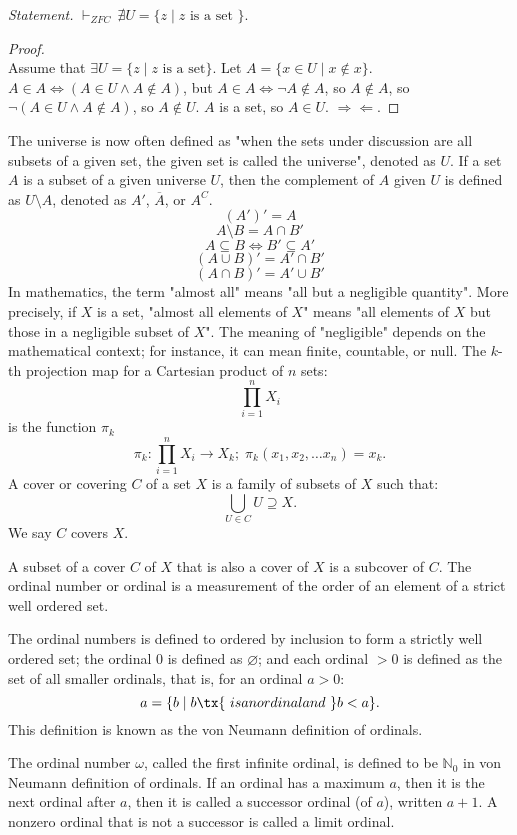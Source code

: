 \documentclass[a4paper,12pt]{report}
\begin{document}
\textit{Statement.} $\vdash_{ZFC}\,\nexists U = \{z \mid z\text{\ is a set\ }\}$.
\begin{proof}\mbox{}\\
Assume that $\exists U = \{z \mid z\text{ is a set}\}$. Let $A=\{x\in U \mid x\notin x\}$. $A \in A\iff (A\in U \land A\notin A)$, but $A\in A \iff \neg A \notin A$, so $A\notin A$, so $\neg(A \in U \land A \notin A)$, so $A \notin U$. $A$ is a set, so $A\in U$. $\Rightarrow\Leftarrow$.
\end{proof}
The universe is now often defined as "when the sets under discussion are all subsets of a given set, the given set is called the universe", denoted as $U$.
If a set $A$ is a subset of a given universe $U$, then the complement of $A$ given $U$ is defined as $U\setminus A$, denoted as $A'$, $\overline{A}$, or $A^C$.
\[(A')'=A\]
\[A\setminus B = A\cap B'\]
\[A\subseteq B \iff B' \subseteq A'\]
\[(A\cup B)'=A'\cap B'\]
\[(A\cap B)'=A'\cup B'\]
In mathematics, the term "almost all" means "all but a negligible quantity". More precisely, if $X$ is a set, "almost all elements of $X$" means "all elements of $X$ but those in a negligible subset of $X$". The meaning of "negligible" depends on the mathematical context; for instance, it can mean finite, countable, or null.
The $k$-th projection map for a Cartesian product of $n$ sets:
\[\prod_{i=1}^nX_i\]
is the function $\pi_k$
\[\pi_k\colon\prod_{i=1}^nX_i\to X_k;\;\pi_k(x_1,x_2,\ldots x_n)=x_k.\]
A cover or covering $C$ of a set $X$ is a family of subsets of $X$ such that:
\[\bigcup_{U\in C}U\supseteq X.\]
We say $C$ covers $X$.

A subset of a cover $C$ of $X$ that is also a cover of $X$ is a subcover of $C$.
The ordinal number or ordinal is a measurement of the order of an element of a strict well ordered set.

The ordinal numbers is defined to ordered by inclusion to form a strictly well ordered set; the ordinal $0$ is defined as $\varnothing$; and each ordinal $>0$ is defined as the set of all smaller ordinals, that is, for an ordinal $a>0$:
\[a=\{b\mid b\tx{\ is an ordinal and\ }b<a\}.\]
This definition is known as the von Neumann definition of ordinals.

The ordinal number $\omega$, called the first infinite ordinal, is defined to be $\mathbb{N}_0$ in von Neumann definition of ordinals.
If an ordinal has a maximum $a$, then it is the next ordinal after $a$, then it is called a successor ordinal (of $a$), written $a+1$.
A nonzero ordinal that is not a successor is called a limit ordinal.
\end{document}
